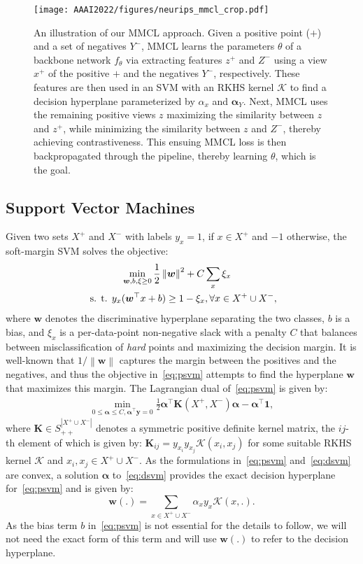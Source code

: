 \documentclass[letterpaper]{article} \usepackage{aaai22}  \usepackage{times}  \usepackage{helvet}  \usepackage{courier}  \usepackage[hyphens]{url}  \usepackage{graphicx} \urlstyle{rm} \def\UrlFont{\rm}  \usepackage{natbib}  \usepackage{caption} \DeclareCaptionStyle{ruled}{labelfont=normalfont,labelsep=colon,strut=off} \frenchspacing  \setlength{\pdfpagewidth}{8.5in}  \setlength{\pdfpageheight}{11in}
\newcommand{\vx}{x}\newcommand{\px}{x^+}\newcommand{\nx}{x^{-}} \newcommand{\vz}{\bm{z}}
\newcommand{\vy}{\bm{y}}
\newcommand{\vw}{\bm{w}}
\newcommand{\valpha}{\bm{\alpha}}
\newcommand{\vone}{\bm{1}}
\newcommand{\mY}{{Y}}
\newcommand{\kernel}{\mathcal{K}}
\newcommand{\Kernel}{\bm{K}}
\newcommand{\pX}{{X}^+}
\newcommand{\nX}{{X}^-}
\newcommand{\half}{\tfrac{1}{2}}
\newcommand{\enorm}[1]{\left\|#1\right\|}
\newcommand{\spd}[1]{S^{#1}_{++}}
\begin{document}
\begin{figure}
    \centering
    \texttt{[image: AAAI2022/figures/neurips\_mmcl\_crop.pdf]}
    \caption{An illustration of our MMCL approach. Given a positive point ($+$) and a set of negatives $\mY^{-}$, MMCL learns the parameters $\theta$ of a backbone network $f_\theta$ via extracting features $z^+$ and $Z^-$ using a view $x^+$ of the positive $+$ and the negatives $Y^-$, respectively. These features are then used in an SVM with an RKHS kernel $\kernel$ to find a decision hyperplane parameterized by $\alpha_x$ and $\valpha_Y$. Next, MMCL uses the remaining positive views $z$ maximizing the similarity between $z$ and $z^+$, while minimizing the similarity between $z$ and $Z^-$, thereby achieving contrastiveness. This ensuing MMCL loss is then backpropagated through the pipeline, thereby learning $\theta$, which is the goal.}
    \label{fig:representative_figure}
\end{figure}

\subsection{Support Vector Machines}
Given two sets $\pX$ and $\nX$ with labels $y_\vx=1$, if $\vx\in\pX$ and $-1$ otherwise, the soft-margin SVM solves the objective:
\begin{align}
    &\min_{\vw, b, \xi\geq 0} \frac{1}{2}\enorm{\vw}^2 + C\sum_{\vx}\xi_\vx \notag\\
    \text{ s. t. }  y_\vx&(\vw^\top\vx + b) \geq 1-\xi_\vx, \forall\vx\in\pX \cup \nX,
\label{eq:psvm}
\end{align}
where $\vw$ denotes the discriminative hyperplane separating the two classes, $b$ is a bias, and $\xi_\vx$ is a per-data-point non-negative slack with a penalty $C$ that balances between misclassification of \emph{hard} points and maximizing the decision margin. It is well-known that $1/\enorm{\vw}$ captures the margin between the positives and the negatives, and thus the objective in~\eqref{eq:psvm} attempts to find the hyperplane $\vw$ that maximizes this margin. The Lagrangian dual of~\eqref{eq:psvm} is given by:
\begin{align}
     \min_{0\leq \valpha\leq C, \valpha^\top\vy=0} \half\valpha^{\top}\Kernel(\pX,\nX)\valpha - \valpha^{\top}\vone,
    \label{eq:dsvm}
\end{align}
where $\Kernel\in\spd{|\pX\cup\nX|}$ denotes a symmetric positive definite kernel matrix, the $ij$-th element of which is given by: $\Kernel_{ij}= y_{\vx_i}y_{\vx_j}\kernel(\vx_i, \vx_j)$ for some suitable RKHS kernel $\kernel$ and $\vx_i,\vx_j\in\pX\cup\nX$. As the formulations in~\eqref{eq:psvm} and~\eqref{eq:dsvm} are convex, a solution $\valpha$ to~\eqref{eq:dsvm} provides the exact decision hyperplane for~\eqref{eq:psvm} and is given by:
\begin{equation}
    \vw(.) = \sum_{\vx\in\pX\cup\nX}\!\!\!\!\!\! \alpha_{\vx}y_{\vx}\kernel(\vx, .).
    \label{eq:hyperplane}
\end{equation}
As the bias term $b$ in~\eqref{eq:psvm} is not essential for the details to follow, we will not need the exact form of this term and will use $\vw(.)$ to refer to the decision hyperplane.
\end{document}
